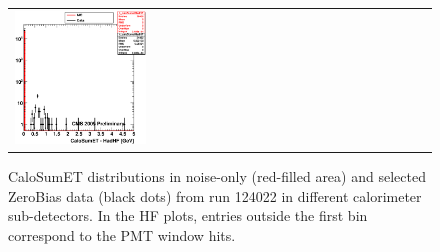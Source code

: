 \begin{figure}[h!]
\begin{tabular}{ll}
  \includegraphics[width=0.33\textwidth]{plots_CaloNoise/h_caloSumetHadHF.eps} \\
 \end{tabular}
 \caption{\small CaloSumET distributions in noise-only (red-filled area) and selected ZeroBias data (black dots) from
run 124022 in different calorimeter sub-detectors. In the HF plots, entries outside the first bin correspond to the PMT
window hits.\label{fig:subdet_CaloSumET}}
\end{figure}